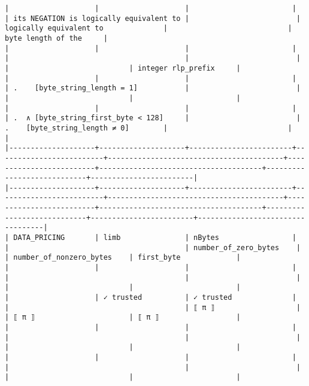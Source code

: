 \documentclass[varwidth=\maxdimen,margin=0.5cm,multi={verbatim}]{standalone}
\begin{document}
\begin{verbatim}
|                    |                    |                        |                         | its NEGATION is logically equivalent to |                         | logically equivalent to              |                            | byte length of the     |
|                    |                    |                        |                         |                                         |                         |                                      |                            | integer rlp_prefix     |
|                    |                    |                        |                         | .    [byte_string_length = 1]           |                         |                                      |                            |                        |
|                    |                    |                        |                         | .  ∧ [byte_string_first_byte < 128]     |                         | .    [byte_string_length ≠ 0]        |                            |                        |
|--------------------+--------------------+------------------------+-------------------------+-----------------------------------------+-------------------------+--------------------------------------+----------------------------+------------------------|
|--------------------+--------------------+------------------------+-------------------------+-----------------------------------------+-------------------------+--------------------------------------+----------------------------+------------------------+----------------------------------|
| DATA_PRICING       | limb               | nBytes                 |                         |                                         | number_of_zero_bytes    |                                      | number_of_nonzero_bytes    | first_byte             |
|                    |                    |                        |                         |                                         |                         |                                      |                            |                        |
|                    | ✓ trusted          | ✓ trusted              |                         |                                         | ⟦ π ⟧                   |                                      | ⟦ π ⟧                      | ⟦ π ⟧                  |
|                    |                    |                        |                         |                                         |                         |                                      |                            |                        |
|                    |                    |                        |                         |                                         |                         |                                      |                            |                        |

\end{verbatim}
\end{document}
